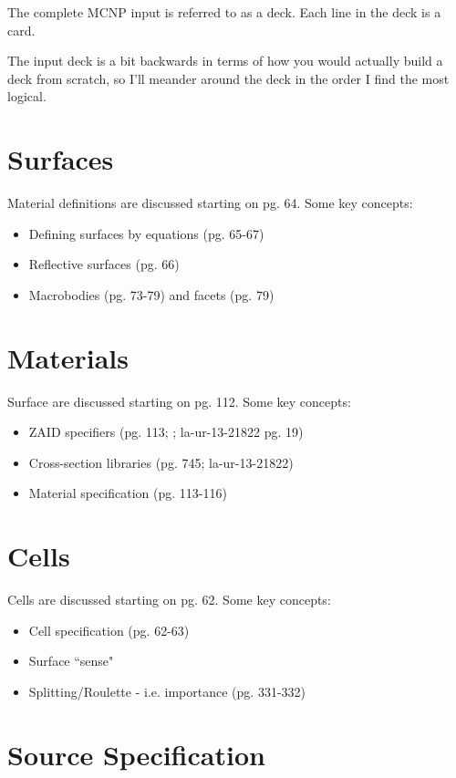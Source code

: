 \documentclass[12pt]{article}
\begin{document}
The complete MCNP input is referred to as a deck.
Each line in the deck is a card.

The input deck is a bit backwards in terms of how you would actually build a deck from scratch, so I'll meander around the deck in the order I find the most logical.

\section*{Surfaces}

Material definitions are discussed starting on pg. 64.
Some key concepts:

\begin{itemize}
  \item Defining surfaces by equations (pg. 65-67)
  \item Reflective surfaces (pg. 66)
  \item Macrobodies (pg. 73-79) and facets (pg. 79)
\end{itemize}

\section*{Materials}

Surface are discussed starting on pg. 112.
Some key concepts:

\begin{itemize}
  \item ZAID specifiers (pg. 113; ; la-ur-13-21822 pg. 19)
  \item Cross-section libraries (pg. 745; la-ur-13-21822)
  \item Material specification (pg. 113-116)
\end{itemize}

\section*{Cells}

Cells are discussed starting on pg. 62.
Some key concepts:

\begin{itemize}
  \item Cell specification (pg. 62-63)
  \item Surface ``sense"
  \item Splitting/Roulette - i.e. importance (pg. 331-332)
\end{itemize}

\section*{Source Specification}
\end{document}

